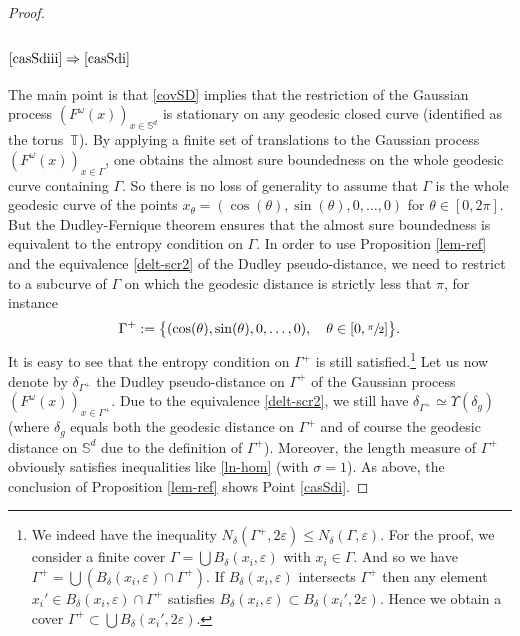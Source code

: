 \documentclass[JEP,XML,SOM,Unicode,NoEqCountersInSection,published]{cedram}
\theoremstyle{theorem}
\theoremstyle{definition}
\newcommand\bbS{\mathbb{S}}
\newcommand\ep{\varepsilon}
\begin{document}
\begin{proof}
\subsubsection*{$\eqref{casSdiii}\Rightarrow\eqref{casSdi}$}
The main point is that \eqref{covSD} implies that the restriction of the Gaussian process $(F^\omega(x))_{x\in\bbS^d}$ is stationary on any geodesic closed curve (identified as the torus~$\mathbb{T}$).
By applying a finite set of translations to the Gaussian process $(F^\omega(x))_{x\in \Gamma}$, one obtains the almost sure boundedness on the whole geodesic curve containing $\Gamma$.
So there is no loss of generality to assume that $\Gamma$ is the whole geodesic curve of the points $x_\theta=(\cos(\theta),\sin(\theta),0,\dots,0)$ for $\theta \in [0,2\pi]$.
But the Dudley-Fernique theorem ensures that the almost sure boundedness is equivalent to the entropy condition on $\Gamma$.
In order to use Proposition \ref{lem-ref} and the equivalence \eqref{delt-scr2} of the Dudley pseudo-distance, we need to restrict to a subcurve of $\Gamma$ on which the geodesic distance is strictly less that $\pi$, for instance
\begin{equation}\label{gammapl}
\Gamma^{+}:=\bigl\{(\cos(\theta),\sin(\theta),0,\dots,0),\quad \theta \in[0,\sfrac{\pi}{2}] \bigr\}.
\end{equation}
It is easy to see that the entropy condition on $\Gamma^{+}$ is still satisfied.\footnote{We indeed have the inequality $N_{\delta}(\Gamma^+,2\ep)\leq N_{\delta}(\Gamma,\ep)$. For the proof, we consider a finite cover $\Gamma=\bigcup B_{\delta}(x_i,\ep)$ with $x_i\in \Gamma$.
And so we have $\Gamma^+=\bigcup (B_{\delta}(x_i,\ep)\cap \Gamma^+)$.
If $B_{\delta}(x_i,\ep)$ intersects $\Gamma^+$ then any element $x_i'\in B_{\delta}(x_i,\ep)\cap \Gamma^{+}$ satisfies $B_{\delta}(x_i,\ep)\subset B_{\delta}(x_i',2\ep)$. Hence we obtain a cover $\Gamma^+\subset \bigcup B_{\delta}(x_i',2\ep)$.}
Let us now denote by $\delta_{\Gamma^+}$ the Dudley pseudo-distance on $\Gamma^+$ of the Gaussian process $(F^\omega(x))_{x\in \Gamma^+}$. Due to the equivalence \eqref{delt-scr2}, we still have $\delta_{\Gamma^+}\simeq \Upsilon(\delta_g)$ (where $\delta_g$ equals both the geodesic distance on $\Gamma^{+}$ and of course the geodesic distance on $\bbS^d$ due to the definition of $\Gamma^{+}$). Moreover, the length measure of $\Gamma^+$ obviously satisfies inequalities like \eqref{ln-hom} (with $\sigma=1$). As above, the conclusion of Proposition \ref{lem-ref} shows Point \eqref{casSdi}.
\end{proof}
\end{document}
